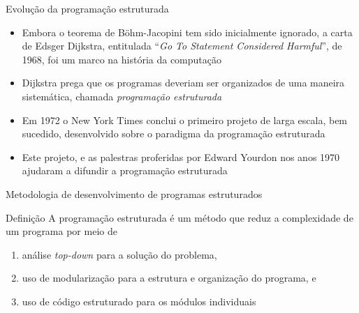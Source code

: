 \begin{frame}[fragile]{Evolução da programação estruturada}

    \begin{itemize}
        \item Embora o teorema de Böhm-Jacopini tem sido inicialmente ignorado, a carta de Edsger
            Dijkstra, entitulada ``\textit{Go To Statement Considered Harmful}'', de 1968, foi
            um marco na história da computação

        \item Dijkstra prega que os programas deveriam ser organizados de uma maneira sistemática,
            chamada \textit{programação estruturada}

        \item Em 1972 o New York Times conclui o primeiro projeto de larga escala, bem sucedido,
            desenvolvido sobre o paradigma da programação estruturada

        \item Este projeto, e as palestras proferidas por Edward Yourdon nos anos 1970 ajudaram a
            difundir a programação estruturada
    \end{itemize}

\end{frame}

\begin{frame}[fragile]{Metodologia de desenvolvimento de programas estruturados}

    \begin{block}{Definição}
        A programação estruturada é um método que reduz a complexidade de um programa por meio de

        \begin{enumerate}
            \item análise \textit{top-down} para a solução do problema,
            \item uso de modularização para a estrutura e organização do programa, e
            \item uso de código estruturado para os módulos individuais
        \end{enumerate}
    \end{block}

\end{frame}

